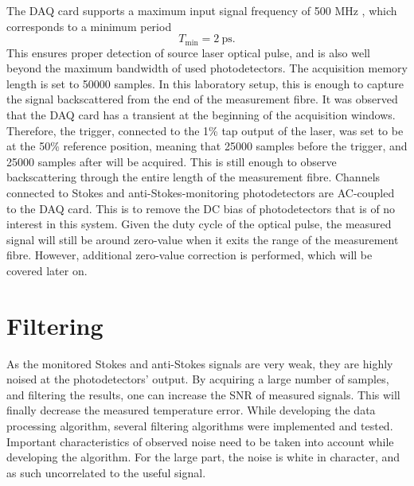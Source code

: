 \documentclass{standalone}
\begin{document}
The DAQ card supports a maximum input signal frequency of 500 MHz \cite{datasheet:daq}, which corresponds to a minimum period
\begin{equation}
T_\textrm{min} = \SI{2}{\pico \second} \textrm{.}
\end{equation}
This ensures proper detection of source laser optical pulse, and is also well beyond the maximum bandwidth of used photodetectors. The acquisition memory length is set to 50000 samples. In this laboratory setup, this is enough to capture the signal backscattered from the end of the measurement fibre. It was observed that the DAQ card has a transient at the beginning of the acquisition windows. Therefore, the trigger, connected to the 1\% tap output of the laser, was set to be at the 50\% reference position, meaning that 25000 samples before the trigger, and 25000 samples after will be acquired. This is still enough to observe backscattering through the entire length of the measurement fibre. Channels connected to Stokes and anti-Stokes-monitoring photodetectors are AC-coupled to the DAQ card. This is to remove the DC bias of photodetectors that is of no interest in this system. Given the duty cycle of the optical pulse, the measured signal will still be around zero-value when it exits the range of the measurement fibre. However, additional zero-value correction is performed, which will be covered later on. \\

\section{Filtering}

As the monitored Stokes and anti-Stokes signals are very weak, they are highly noised at the photodetectors' output. By acquiring a large number of samples, and filtering the results, one can increase the SNR of measured signals. This will finally decrease the measured temperature error. While developing the data processing algorithm, several filtering algorithms were implemented and tested. Important characteristics of observed noise need to be taken into account while developing the algorithm. For the large part, the noise is white in character, and as such uncorrelated to the useful signal. \\
\end{document}
